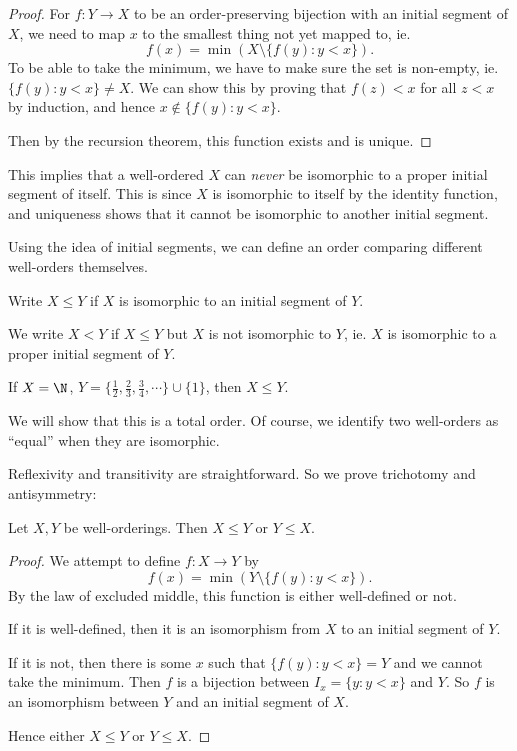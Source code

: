 \documentclass[a4paper]{article}
\begin{document}
\begin{proof}
  For $f: Y\to X$ to be an order-preserving bijection with an initial segment of $X$, we need to map $x$ to the smallest thing not yet mapped to, ie.
  \[
    f(x) = \min (X\setminus \{f(y): y < x\}).
  \]
  To be able to take the minimum, we have to make sure the set is non-empty, ie. $\{f(y): y < x\} \not= X$. We can show this by proving that $f(z) < x$ for all $z < x$ by induction, and hence $x \not\in \{f(y): y < x\}$.

  Then by the recursion theorem, this function exists and is unique.
\end{proof}
This implies that a well-ordered $X$ can \emph{never} be isomorphic to a proper initial segment of itself. This is since $X$ is isomorphic to itself by the identity function, and uniqueness shows that it cannot be isomorphic to another initial segment.

Using the idea of initial segments, we can define an order comparing different well-orders themselves.
\begin{notation}
  Write $X\leq Y$ if $X$ is isomorphic to an initial segment of $Y$.

  We write $X < Y$ if $X\leq Y$ but $X$ is not isomorphic to $Y$, ie. $X$ is isomorphic to a proper initial segment of $Y$.
\end{notation}

\begin{eg}
  If $X = \N$, $Y = \{\frac{1}{2}, \frac{2}{3}, \frac{3}{4},\cdots\}\cup \{1\}$, then $X \leq Y$.
\end{eg}

We will show that this is a total order. Of course, we identify two well-orders as ``equal'' when they are isomorphic.

Reflexivity and transitivity are straightforward. So we prove trichotomy and antisymmetry:
\begin{thm}
  Let $X, Y$ be well-orderings. Then $X\leq Y$ or $Y \leq X$.
\end{thm}

\begin{proof}
  We attempt to define $f: X\to Y$ by
  \[
    f(x) = \min (Y\setminus \{f(y): y < x\}).
  \]
  By the law of excluded middle, this function is either well-defined or not.

  If it is well-defined, then it is an isomorphism from $X$ to an initial segment of $Y$.

  If it is not, then there is some $x$ such that $\{f(y): y < x\} = Y$ and we cannot take the minimum. Then $f$ is a bijection between $I_x = \{y: y < x\}$ and $Y$. So $f$ is an isomorphism between $Y$ and an initial segment of $X$.

  Hence either $X \leq Y$ or $Y \leq X$.
\end{proof}
\end{document}
